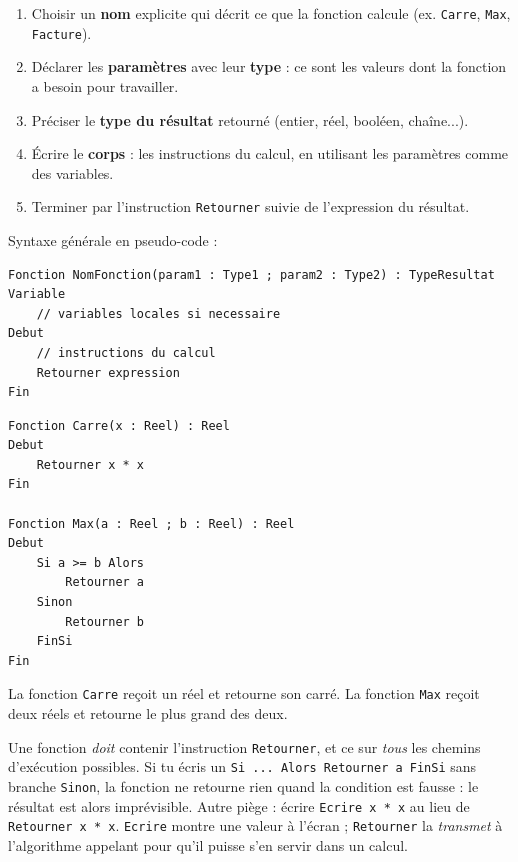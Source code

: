 \documentclass[11pt]{article}
\begin{document}
\begin{methode}
\begin{enumerate}
  \item Choisir un \textbf{nom} explicite qui décrit ce que la fonction calcule (ex. \texttt{Carre}, \texttt{Max}, \texttt{Facture}).
  \item Déclarer les \textbf{paramètres} avec leur \textbf{type} : ce sont les valeurs dont la fonction a besoin pour travailler.
  \item Préciser le \textbf{type du résultat} retourné (entier, réel, booléen, chaîne...).
  \item Écrire le \textbf{corps} : les instructions du calcul, en utilisant les paramètres comme des variables.
  \item Terminer par l'instruction \texttt{Retourner} suivie de l'expression du résultat.
\end{enumerate}
Syntaxe générale en pseudo-code :
\begin{lstlisting}
Fonction NomFonction(param1 : Type1 ; param2 : Type2) : TypeResultat
Variable
    // variables locales si necessaire
Debut
    // instructions du calcul
    Retourner expression
Fin
\end{lstlisting}
\end{methode}

\begin{exemplebox}
\begin{lstlisting}
Fonction Carre(x : Reel) : Reel
Debut
    Retourner x * x
Fin

Fonction Max(a : Reel ; b : Reel) : Reel
Debut
    Si a >= b Alors
        Retourner a
    Sinon
        Retourner b
    FinSi
Fin
\end{lstlisting}
La fonction \texttt{Carre} reçoit un réel et retourne son carré. La fonction \texttt{Max} reçoit deux réels et retourne le plus grand des deux.
\end{exemplebox}

\begin{attention}
Une fonction \emph{doit} contenir l'instruction \texttt{Retourner}, et ce sur \emph{tous} les chemins d'exécution possibles. Si tu écris un \texttt{Si ... Alors Retourner a FinSi} sans branche \texttt{Sinon}, la fonction ne retourne rien quand la condition est fausse : le résultat est alors imprévisible. Autre piège : écrire \texttt{Ecrire x * x} au lieu de \texttt{Retourner x * x}. \texttt{Ecrire} montre une valeur à l'écran ; \texttt{Retourner} la \emph{transmet} à l'algorithme appelant pour qu'il puisse s'en servir dans un calcul.
\end{attention}
\end{document}
